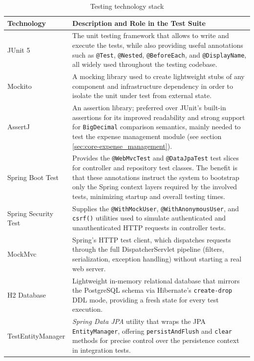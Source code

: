 \begin{table}[H]
\centering
\renewcommand{\arraystretch}{1.2}
\begin{tabular}{@{}lp{10cm}@{}}
\toprule
\textbf{Technology} & \textbf{Description and Role in the Test Suite} \\ \midrule
JUnit 5 & The unit testing framework that allows to write and execute the tests, while also providing useful annotations such as \texttt{@Test}, \texttt{@Nested}, \texttt{@BeforeEach}, and \texttt{@DisplayName}, all widely used throughout the testing codebase. \\
Mockito & A mocking library used to create lightweight stubs of any component and infrastructure dependency in order to isolate the unit under test from external state. \\
AssertJ & An assertion library; preferred over JUnit's built-in assertions for its improved readability and strong support for \texttt{BigDecimal} comparison semantics, mainly needed to test the expense management module (see section \ref{sec:core-expense_management}). \\
Spring Boot Test & Provides the \texttt{@WebMvcTest} and \texttt{@DataJpaTest} test slices for controller and repository test classes. The benefit is that these annotations instruct the system to bootstrap only the Spring context layers required by the involved tests, minimizing startup and overall testing times. \\
Spring Security Test & Supplies the \texttt{@WithMockUser}, \texttt{@WithAnonymousUser}, and \texttt{csrf()} utilities used to simulate authenticated and unauthenticated HTTP requests in controller tests. \\
MockMvc & Spring's HTTP test client, which dispatches requests through the full DispatcherServlet pipeline (filters, serialization, exception handling) without starting a real web server. \\
H2 Database & Lightweight in-memory relational database that mirrors the PostgreSQL schema via Hibernate's \texttt{create-drop} DDL mode, providing a fresh state for every test execution. \\
TestEntityManager & \textit{Spring Data JPA} utility that wraps the JPA \texttt{EntityManager}, offering \texttt{persistAndFlush} and \texttt{clear} methods for precise control over the persistence context in integration tests. \\
\bottomrule
\end{tabular}
\caption{Testing technology stack}
\label{tab:test-stack}
\end{table}


